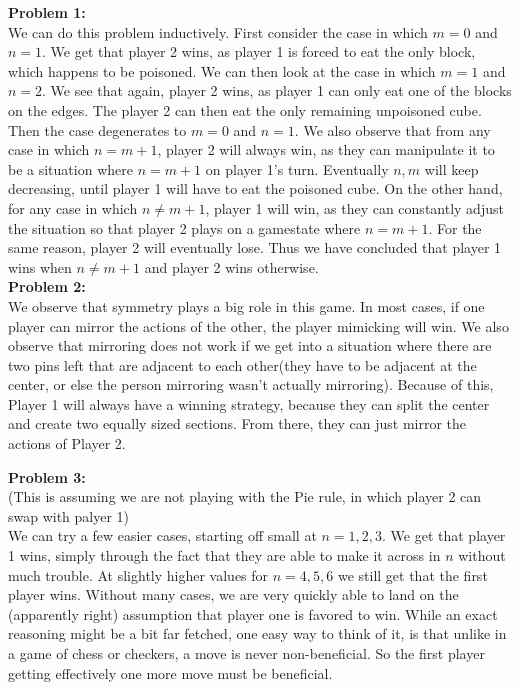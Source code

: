 \documentclass[12pt]{article}
\begin{document}
\noindent
\textbf{Problem 1:}\\

We can do this problem inductively. First consider the case in which $m = 0$ and $n = 1$.
We get that player 2 wins, as player 1 is forced to eat the only block, which happens to be poisoned. 
We can then look at the case in which $m = 1$ and $n = 2$. We see that again, player 2 wins, as player 1 can only eat
one of the blocks on the edges. The player 2 can then eat the only remaining unpoisoned cube. Then the case degenerates to $m = 0$ and $n = 1$.
We also observe that from any case in which $n = m + 1$, player 2 will always win, as they can manipulate it to
be a situation where $n = m + 1$ on player 1's turn. Eventually $n,m$ will keep decreasing, until player 1 will have to eat the poisoned cube. 
On the other hand, for any case in which $n \ne m+1$, player 1 will win, as they can constantly adjust the situation so that player 2 plays 
on a gamestate where $n = m+1$. For the same reason, player 2 will eventually lose. Thus we have
concluded that player 1 wins when $n \ne m+1$ and player 2 wins otherwise.\\

\noindent 
\textbf{Problem 2:}\\

We observe that symmetry plays a big role in this game. In most cases, if one player can mirror the actions of the other,
the player mimicking will win. We also observe that mirroring does not work if we get into a situation where there are two pins left
that are adjacent to each other(they have to be adjacent at the center, or else the person mirroring wasn't actually mirroring).
Because of this, Player 1 will always have a winning strategy, because they can split the center and create two equally sized sections. From
there, they can just mirror the actions of Player 2. 

\noindent
\textbf{Problem 3: }\\

(This is assuming we are not playing with the Pie rule, in which player 2 can swap with palyer 1)\\
We can try a few easier cases, starting off small at $n = 1,2,3$. We get that player 1 wins, simply through the fact that 
they are able to make it across in $n$ without much trouble. At slightly higher values for $n = 4, 5, 6$ we still get that the first player wins.
Without many cases, we are very quickly able to land on the (apparently right) assumption that player one is favored to win.
While an exact reasoning might be a bit far fetched, one easy way to think of it, is that unlike in a game of chess or checkers, a move is never
non-beneficial. So the first player getting effectively one more move must be beneficial.
\end{document}
